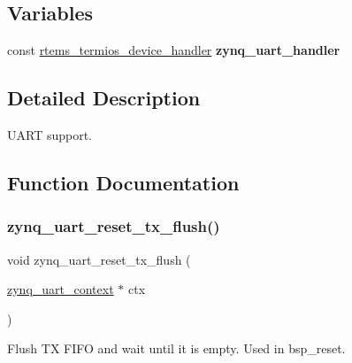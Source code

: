 \subsection*{Variables}
\begin{DoxyCompactItemize}
\item 
\mbox{\label{zynq-uart_8h_a3e5abde2bba499edac29910f560b337f}} 
const \mbox{\hyperlink{structrtems__termios__device__handler}{rtems\+\_\+termios\+\_\+device\+\_\+handler}} {\bfseries zynq\+\_\+uart\+\_\+handler}
\end{DoxyCompactItemize}


\subsection{Detailed Description}
U\+A\+RT support. 



\subsection{Function Documentation}
\mbox{\label{zynq-uart_8h_a39e4bfc6412d92131bc4b3a086709141}} 
\subsubsection{\texorpdfstring{zynq\_uart\_reset\_tx\_flush()}{zynq\_uart\_reset\_tx\_flush()}}
{\footnotesize\ttfamily void zynq\+\_\+uart\+\_\+reset\+\_\+tx\+\_\+flush (\begin{DoxyParamCaption}\item[{\mbox{\hyperlink{structzynq__uart__context}{zynq\+\_\+uart\+\_\+context}} $\ast$}]{ctx }\end{DoxyParamCaption})}

Flush TX F\+I\+FO and wait until it is empty. Used in bsp\+\_\+reset. 